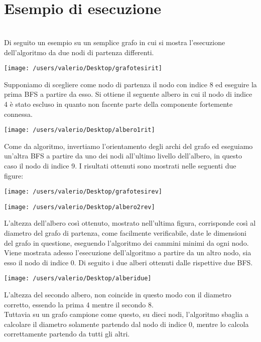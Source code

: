 \documentclass[twoside,openright,titlepage,fleqn,
	headinclude,11pt,a4paper,BCOR5mm,footinclude,pdftex
	]{scrbook}
\begin{document}
\\
\\
\section{Esempio di esecuzione}\\
Di seguito un esempio su un semplice grafo in cui si mostra l'esecuzione dell'algoritmo da due nodi di partenza differenti.
\begin{center}
\texttt{[image: /users/valerio/Desktop/grafotesirit]}
\end{center}
Supponiamo di scegliere come nodo di partenza il nodo con indice 8 ed eseguire la prima BFS a partire da esso.
Si ottiene il seguente albero in cui il nodo di indice 4 è stato escluso in quanto non facente parte della componente fortemente connessa.
\begin{center}
\texttt{[image: /users/valerio/Desktop/albero1rit]}
\end{center}
Come da algoritmo, invertiamo l'orientamento degli archi del grafo ed eseguiamo un'altra BFS a partire da uno dei nodi all'ultimo livello dell'albero, in questo caso il nodo di indice 9.
I risultati ottenuti sono mostrati nelle seguenti due figure:
\begin{center}
\texttt{[image: /users/valerio/Desktop/grafotesirev]}
\end{center}
\begin{center}
\texttt{[image: /users/valerio/Desktop/albero2rev]}
\end{center}
L'altezza dell'albero così ottenuto, mostrato nell'ultima figura, corrisponde così al diametro del grafo di partenza, come facilmente verificabile, date le dimensioni del grafo in questione, eseguendo l'algoritmo dei cammini minimi da ogni nodo.\\
Viene mostrata adesso l'esecuzione dell'algoritmo a partire da un altro nodo, sia esso il nodo di indice 0.
Di seguito i due alberi ottenuti dalle rispettive due BFS.
\begin{center}
\texttt{[image: /users/valerio/Desktop/alberidue]}
\end{center}
L'altezza del secondo albero, non coincide in questo modo con il diametro corretto, essendo la prima 4 mentre il secondo 8.\\Tuttavia su un grafo campione come questo, su dieci nodi, l'algoritmo sbaglia a calcolare il diametro solamente partendo dal nodo di indice 0, mentre lo calcola correttamente partendo da tutti gli altri.\newpage
\end{document}
